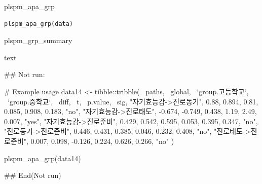 \documentclass[a4paper]{book}
\begin{document}
%
\begin{Description}
plspm\_apa\_grp
\end{Description}
%
\begin{Usage}
\begin{verbatim}
plspm_apa_grp(data)
\end{verbatim}
\end{Usage}
%
\begin{Arguments}
\begin{ldescription}
\item[\code{data}] plspm\_grp\_summary
\end{ldescription}
\end{Arguments}
%
\begin{Value}
text
\end{Value}
%
\begin{Examples}
\begin{ExampleCode}

\#\# Not run: 

# Example usage
data14 <- tibble::tribble(
  ~paths, ~global, ~`group.고등학교`, ~`group.중학교`, ~diff, ~t, ~p.value, ~sig,
  "자기효능감->진로동기", 0.88, 0.894, 0.81, 0.085, 0.908, 0.183, "no",
  "자기효능감->진로태도", -0.674, -0.749, 0.438, 1.19, 2.49, 0.007, "yes",
  "자기효능감->진로준비", 0.429, 0.542, 0.595, 0.053, 0.395, 0.347, "no",
  "진로동기->진로준비", 0.446, 0.431, 0.385, 0.046, 0.232, 0.408, "no",
  "진로태도->진로준비", 0.007, 0.098, -0.126, 0.224, 0.626, 0.266, "no"
)

plspm_apa_grp(data14)


## End(Not run)

\end{ExampleCode}
\end{Examples}
\end{document}
